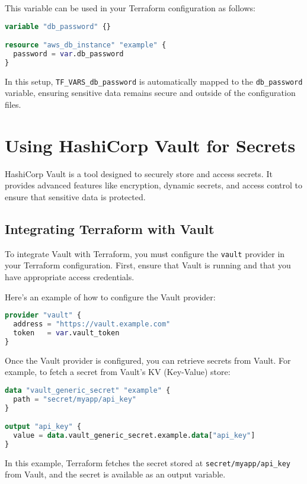 This variable can be used in your Terraform configuration as follows:

\begin{lstlisting}[language=terraform]
variable "db_password" {}

resource "aws_db_instance" "example" {
  password = var.db_password
}
\end{lstlisting}

In this setup, \texttt{TF\_VARS\_db\_password} is automatically mapped to the \texttt{db\_password} variable, ensuring sensitive data remains secure and outside of the configuration files.

\section{Using HashiCorp Vault for Secrets}

HashiCorp Vault is a tool designed to securely store and access secrets. It provides advanced features like encryption, dynamic secrets, and access control to ensure that sensitive data is protected.

\subsection{Integrating Terraform with Vault}

To integrate Vault with Terraform, you must configure the \texttt{vault} provider in your Terraform configuration. First, ensure that Vault is running and that you have appropriate access credentials.

Here's an example of how to configure the Vault provider:

\begin{lstlisting}[language=terraform]
provider "vault" {
  address = "https://vault.example.com"
  token   = var.vault_token
}
\end{lstlisting}

Once the Vault provider is configured, you can retrieve secrets from Vault. For example, to fetch a secret from Vault's KV (Key-Value) store:

\begin{lstlisting}[language=terraform]
data "vault_generic_secret" "example" {
  path = "secret/myapp/api_key"
}

output "api_key" {
  value = data.vault_generic_secret.example.data["api_key"]
}
\end{lstlisting}

In this example, Terraform fetches the secret stored at \texttt{secret/myapp/api\_key} from Vault, and the secret is available as an output variable.

